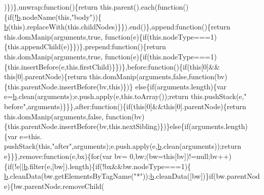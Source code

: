 \begin{DoxyCode}
      )\})\},unwrap:\textcolor{keyword}{function}()\{\textcolor{keywordflow}{return} this.parent().each(\textcolor{keyword}{function}()\{\textcolor{keywordflow}{if}(!\hyperlink{a00039_aa4026ad5544b958e54ce5e106fa1c805}{b}.nodeName(\textcolor{keyword}{this},\textcolor{stringliteral}{"body"}))\{
      \hyperlink{a00039_aa4026ad5544b958e54ce5e106fa1c805}{b}(\textcolor{keyword}{this}).replaceWith(this.childNodes)\}\}).end()\},append:\textcolor{keyword}{function}()\{\textcolor{keywordflow}{return} this.domManip(arguments,\textcolor{keyword}{true},\textcolor{keyword}{
      function}(e)\{\textcolor{keywordflow}{if}(this.nodeType===1)\{this.appendChild(e)\}\})\},prepend:\textcolor{keyword}{function}()\{\textcolor{keywordflow}{return} this.domManip(arguments,\textcolor{keyword}{true},\textcolor{keyword}{
      function}(e)\{\textcolor{keywordflow}{if}(this.nodeType===1)\{this.insertBefore(e,this.firstChild)\}\})\},before:\textcolor{keyword}{function}()\{\textcolor{keywordflow}{if}(\textcolor{keyword}{this}[0]&&\textcolor{keyword}{
      this}[0].parentNode)\{\textcolor{keywordflow}{return} this.domManip(arguments,\textcolor{keyword}{false},\textcolor{keyword}{function}(bv)\{this.parentNode.insertBefore(bv,\textcolor{keyword}{this})\})\}\textcolor{keywordflow}{
      else}\{\textcolor{keywordflow}{if}(arguments.length)\{var e=\hyperlink{a00039_aa4026ad5544b958e54ce5e106fa1c805}{b}.clean(arguments);e.push.apply(e,this.toArray());\textcolor{keywordflow}{return} this.pushStack(e,\textcolor{stringliteral}{"
      before"},arguments)\}\}\},after:\textcolor{keyword}{function}()\{\textcolor{keywordflow}{if}(\textcolor{keyword}{this}[0]&&\textcolor{keyword}{this}[0].parentNode)\{\textcolor{keywordflow}{return} this.domManip(arguments,\textcolor{keyword}{false},\textcolor{keyword}{
      function}(bv)\{this.parentNode.insertBefore(bv,this.nextSibling)\})\}\textcolor{keywordflow}{else}\{\textcolor{keywordflow}{if}(arguments.length)\{var e=this.
      pushStack(\textcolor{keyword}{this},\textcolor{stringliteral}{"after"},arguments);e.push.apply(e,\hyperlink{a00039_aa4026ad5544b958e54ce5e106fa1c805}{b}.clean(arguments));\textcolor{keywordflow}{return} e\}\}\},\textcolor{keyword}{remove}:\textcolor{keyword}{function}(e,bx)\{\textcolor{keywordflow}{for}(var bv=
      0,bw;(bw=\textcolor{keyword}{this}[bv])!=null;bv++)\{\textcolor{keywordflow}{if}(!e||\hyperlink{a00039_aa4026ad5544b958e54ce5e106fa1c805}{b}.filter(e,[bw]).length)\{\textcolor{keywordflow}{if}(!bx&&bw.nodeType===1)\{
      \hyperlink{a00039_aa4026ad5544b958e54ce5e106fa1c805}{b}.cleanData(bw.getElementsByTagName(\textcolor{stringliteral}{"*"}));\hyperlink{a00039_aa4026ad5544b958e54ce5e106fa1c805}{b}.cleanData([bw])\}\textcolor{keywordflow}{if}(bw.parentNode)\{bw.parentNode.removeChild(

\end{DoxyCode}
